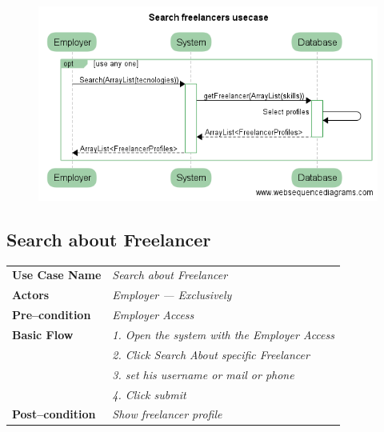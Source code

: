\documentclass{article}
\begin{document}
\begin{figure}[ht!]
\centering
\includegraphics[width=128mm]{Search_Freelancers_usecase.png}
\end{figure}



\newpage

\subsection{Search about Freelancer}
    \begin{tabular}{ l | l }
    \toprule
      \rowcolor{LightCyan}
      \textbf{Use Case Name}    & \textit{Search about Freelancer}\\
      \textbf{Actors}           & \textit{Employer --- Exclusively}\\
      \rowcolor{LightCyan}
      \textbf{Pre--condition}   & \textit{Employer Access}\\
      \textbf{Basic Flow}       & \textit{1. Open the system with the Employer Access}\\
                                & \textit{2. Click Search About specific Freelancer}\\
                                & \textit{3. set his username or mail or phone}\\
                                & \textit{4. Click submit}\\
      \rowcolor{LightCyan}
      \textbf{Post--condition}  & \textit{Show freelancer profile}\\
    \toprule
    \end{tabular}
\end{document}
